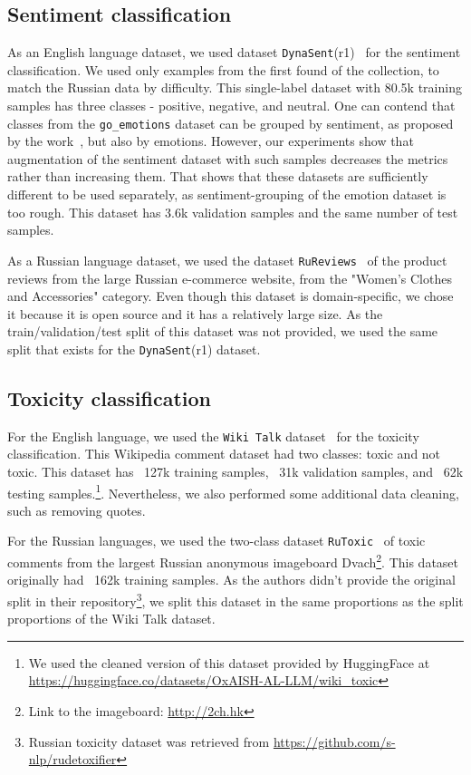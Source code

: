\subsection{Sentiment classification}

As an English language dataset, we used dataset \texttt{DynaSent}(r1)~\cite{sentiment} for the sentiment classification. We used only examples from the first found of the collection, to match the Russian data by difficulty. This single-label dataset with 80.5k training samples has three classes - positive, negative, and neutral. One can contend that classes from the \texttt{go\_emotions} dataset can be grouped by sentiment, as proposed by the work~\cite{emotions}, but also by emotions. However, our experiments show that augmentation of the sentiment dataset with such samples decreases the metrics rather than increasing them. That shows that these datasets are sufficiently different to be used separately, as sentiment-grouping of the emotion dataset is too rough. This dataset has 3.6k validation samples and the same number of test samples. 

As a Russian language dataset, we used the dataset \texttt{RuReviews}~\cite{ru_sentiment} of the product reviews from the large Russian e-commerce website, from the "Women’s Clothes and Accessories" category. Even though this dataset is domain-specific, we chose it because it is open source and it has a relatively large size. As the train/validation/test split of this dataset was not provided, we used the same split that exists for the \texttt{DynaSent}(r1) dataset. 

\subsection{Toxicity classification}

For the English language, we used the \texttt{Wiki Talk} dataset~\cite{toxic} for the toxicity classification. This Wikipedia comment dataset had two classes: toxic and not toxic. This dataset has ~127k training samples, ~31k validation samples, and ~62k testing samples.\footnote{We used the cleaned version of this dataset provided by HuggingFace at \url{https://huggingface.co/datasets/OxAISH-AL-LLM/wiki\_toxic}}. Nevertheless, we also performed some additional data cleaning, such as removing quotes. 

For the Russian languages, we used the two-class dataset \texttt{RuToxic}~\cite{ru_toxic} of toxic comments from the largest Russian anonymous imageboard Dvach\footnote{Link to the imageboard: \url{http://2ch.hk}}. This dataset originally had ~162k training samples. As the authors didn't provide the original split in their repository\footnote{Russian toxicity dataset was retrieved from \url{https://github.com/s-nlp/rudetoxifier}}, we split this dataset in the same proportions as the split proportions of the Wiki Talk dataset.

